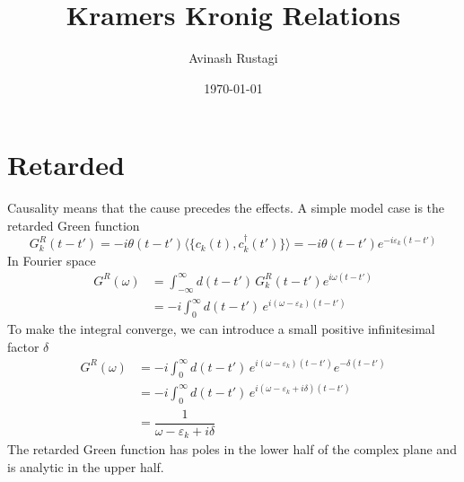\documentclass[aps,prb,onecolumn,notitlepage,showpacs,floatfix,superscriptaddress]{revtex4-1}
\begin{document}
\title{Kramers Kronig Relations}

\author{Avinash Rustagi}
%
\date{\today}

\maketitle
%
\section{Retarded}
Causality means that the cause precedes the effects. A simple model case is the retarded Green function
\begin{equation}
G^R_k(t-t')=-i\theta(t-t') \langle \{ c_k(t),c_k^\dagger(t')\}\rangle = -i\theta(t-t') e^{-i\varepsilon_k (t-t')}
\end{equation}
In Fourier space
\begin{equation}
\begin{split}
G^R(\omega) &= \int_{-\infty}^\infty d(t-t') \, G^R_k(t-t') e^{i \omega (t-t')} \\
&= -i\int_{0}^\infty d(t-t') \, e^{i (\omega-\varepsilon_k) (t-t')} 
\end{split}
\end{equation}
To make the integral converge, we can introduce a small positive infinitesimal factor $\delta$
\begin{equation}
\begin{split}
G^R(\omega) &= -i\int_{0}^\infty d(t-t') \, e^{i (\omega-\varepsilon_k) (t-t')} e^{-\delta(t-t')} \\
 &= -i\int_{0}^\infty d(t-t') \, e^{i (\omega-\varepsilon_k+i\delta) (t-t')} \\
 &= \dfrac{1}{\omega-\varepsilon_k+i\delta}
\end{split}
\end{equation}
The retarded Green function has poles in the lower half of the complex plane and is analytic in the upper half. \\
\end{document}
